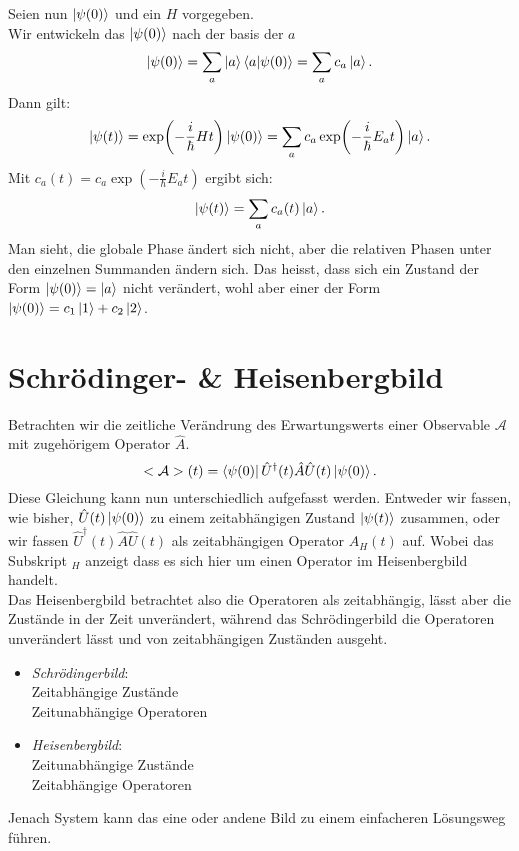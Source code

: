 \documentclass{report}
\begin{document}
Seien nun $\ket{\psi(0)}$ und ein $H$ vorgegeben. \\
Wir entwickeln das $\ket{ \psi(0)}$ nach der basis der $a$  \[
	\ket{ \psi(0)} = \sum_{a} \ket{a} \bra{a} \ket{\psi(0)} = \sum_{a} c_a \ket{a} 
.\] Dann gilt: \[
\ket{\psi(t)} = \exp(-\frac{i}{\hbar} H t) \ket{\psi(0)} = \sum_{a} c_a \exp(-\frac{i}{\hbar } E_a t) \ket{a}  
.\] Mit $c_a(t) = c_a \exp(-\frac{i}{\hbar } E_a t)$ ergibt sich: \[
\ket{\psi(t)} = \sum_{a} c_a(t) \ket{a} 
.\] Man sieht, die globale Phase ändert sich nicht, aber die relativen Phasen unter den einzelnen Summanden ändern sich. Das heisst, dass sich ein Zustand der Form $\ket{\psi(0)} = \ket{a} $ nicht verändert, wohl aber einer der Form $\ket{\psi(0)} = c_1 \ket{1} + c_2 \ket{2} $.
\section{Schrödinger- \& Heisenbergbild}
Betrachten wir die zeitliche Verändrung des Erwartungswerts einer Observable $\mathcal{A}$ mit zugehörigem Operator $\hat{A}$. \[
	<\mathcal{A}>(t) = \bra{\psi(0)} \hat{U}^\dagger(t) \hat{A} \hat{U}(t) \ket{\psi(0)} 
.\] Diese Gleichung kann nun unterschiedlich aufgefasst werden. Entweder wir fassen, wie bisher, $\hat{U}(t) \ket{\psi(0)} $ zu einem zeitabhängigen Zustand $\ket{\psi(t)} $ zusammen, oder wir fassen $\hat{U}^\dagger(t) \hat{A} \hat{U}(t)$ als zeitabhängigen Operator $A_H(t)$ auf. Wobei das Subskript $_H$ anzeigt dass es sich hier um einen Operator im Heisenbergbild handelt. \\
Das Heisenbergbild betrachtet also die Operatoren als zeitabhängig, lässt aber die Zustände in der Zeit unverändert, während das Schrödingerbild die Operatoren unverändert lässt und von zeitabhängigen Zuständen ausgeht. \\
\begin{itemize}
	\item \emph{Schrödingerbild}: \\
		Zeitabhängige Zustände\\
		Zeitunabhängige Operatoren\\
	\item \emph{Heisenbergbild}:\\
		Zeitunabhängige Zustände\\
		Zeitabhängige Operatoren\\
\end{itemize}
Jenach System kann das eine oder andene Bild zu einem einfacheren Lösungsweg führen.
\end{document}
